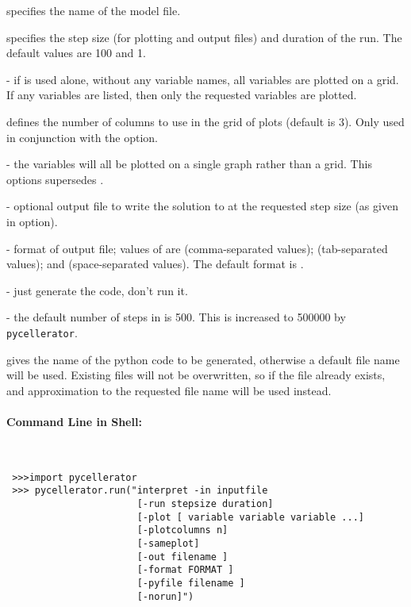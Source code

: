  specifies the name of the model file.

  specifies the step size (for plotting 
and output files) and duration of the run. The default values are 100 and 1. 

  - if  is used 
alone, without any variable names, all variables are plotted on a grid. If any variables are listed, then only the requested variables are plotted. 

  defines the number of columns to use in the grid of plots (default is 3). Only used in conjunction with the  option. 

 - the variables will all be plotted on a single graph rather than a grid. This options supersedes . 

  - optional output file to write the solution to  at the requested step size (as given in  option). 

 - format of output file; values of  are  (comma-separated values);  (tab-separated values); and  (space-separated values). The default format is . 

 - just generate the code, don't run it. 

 - the default number of steps in  is 500. This is increased to 500000 by {\tt pycellerator}. 

  gives the name of the python code to be generated, otherwise a default file name will be used. Existing files will not be overwritten, so if the file already exists, and approximation to the requested file name will be used instead. 


\paragraph{Command Line in Shell:}\ \\

 
\begin{lstlisting}
 >>>import pycellerator
 >>> pycellerator.run("interpret -in inputfile 
                       [-run stepsize duration]
                       [-plot [ variable variable variable ...]
                       [-plotcolumns n]
                       [-sameplot] 
                       [-out filename ]
                       [-format FORMAT ]
                       [-pyfile filename ]
                       [-norun]")
\end{lstlisting}


